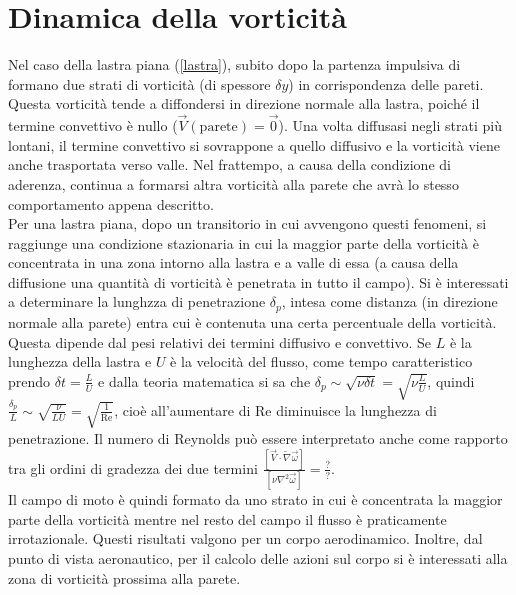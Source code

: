 \documentclass[11pt,a4paper]{report}
\begin{document}
	\section{Dinamica della vorticità}
	Nel caso della lastra piana (\ref{lastra}), subito dopo la partenza impulsiva di formano due strati di vorticità (di spessore $\delta y$) in corrispondenza delle pareti. Questa vorticità tende a diffondersi in direzione normale alla lastra, poiché il termine convettivo è nullo \big($\vec V(\text{parete})=\vec 0$\big). Una volta diffusasi negli strati più lontani, il termine convettivo si sovrappone a quello diffusivo e la vorticità viene anche trasportata verso valle. Nel frattempo, a causa della condizione di aderenza, continua a formarsi altra vorticità alla parete che avrà lo stesso comportamento appena descritto.\\
	Per una lastra piana, dopo un transitorio in cui avvengono questi fenomeni, si raggiunge una condizione stazionaria in cui la maggior parte della vorticità è concentrata in una zona intorno alla lastra e a valle di essa (a causa della diffusione una quantità di vorticità è penetrata in tutto il campo). Si è interessati a determinare la lunghzza di penetrazione $\delta_p$, intesa come distanza (in direzione normale alla parete) entra cui è contenuta una certa percentuale della vorticità. Questa dipende dal pesi relativi dei termini diffusivo e convettivo. Se $L$ è la lunghezza della lastra e $U$ è la velocità del flusso, come tempo caratteristico prendo $\delta t=\frac LU$ e dalla teoria matematica si sa che $\delta_p\sim\sqrt{\nu\delta t}=\sqrt{\nu\frac LU}$, quindi $\frac{\delta_p}{L}\sim\sqrt{\frac{\nu}{LU}}=\sqrt{\frac{1}{\mathrm{Re}}}$, cioè all'aumentare di $\mathrm{Re}$ diminuisce la lunghezza di penetrazione. Il numero di Reynolds può essere interpretato anche come rapporto tra gli ordini di gradezza dei due termini $\frac{[\vec V\cdot\utilde\nabla\vec\omega]}{[\nu\nabla^2\vec\omega]}=\frac{?}{?}$.\\
	Il campo di moto è quindi formato da uno strato in cui è concentrata la maggior parte della vorticità mentre nel resto del campo il flusso è praticamente irrotazionale. Questi risultati valgono per un corpo aerodinamico. Inoltre, dal punto di vista aeronautico, per il calcolo delle azioni sul corpo si è interessati alla zona di vorticità prossima alla parete.
	
\end{document}
